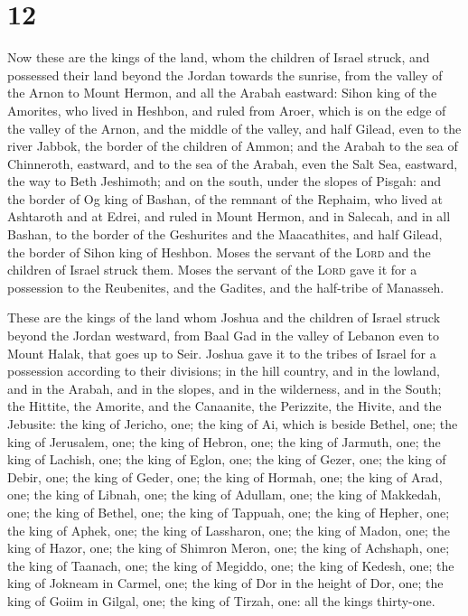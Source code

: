 \hypertarget{section-11}{%
\section{12}\label{section-11}}

 Now these are the kings of the land, whom the children of
Israel struck, and possessed their land beyond the Jordan towards the
sunrise, from the valley of the Arnon to Mount Hermon, and all the
Arabah eastward:  Sihon king of the Amorites, who lived in
Heshbon, and ruled from Aroer, which is on the edge of the valley of the
Arnon, and the middle of the valley, and half Gilead, even to the river
Jabbok, the border of the children of Ammon;  and the
Arabah to the sea of Chinneroth, eastward, and to the sea of the Arabah,
even the Salt Sea, eastward, the way to Beth Jeshimoth; and on the
south, under the slopes of Pisgah:  and the border of Og
king of Bashan, of the remnant of the Rephaim, who lived at Ashtaroth
and at Edrei,  and ruled in Mount Hermon, and in Salecah,
and in all Bashan, to the border of the Geshurites and the Maacathites,
and half Gilead, the border of Sihon king of Heshbon. 
Moses the servant of the \textsc{Lord} and the children of Israel struck
them. Moses the servant of the \textsc{Lord} gave it for a possession to
the Reubenites, and the Gadites, and the half-tribe of Manasseh.

 These are the kings of the land whom Joshua and the
children of Israel struck beyond the Jordan westward, from Baal Gad in
the valley of Lebanon even to Mount Halak, that goes up to Seir. Joshua
gave it to the tribes of Israel for a possession according to their
divisions;  in the hill country, and in the lowland, and
in the Arabah, and in the slopes, and in the wilderness, and in the
South; the Hittite, the Amorite, and the Canaanite, the Perizzite, the
Hivite, and the Jebusite:  the king of Jericho, one; the
king of Ai, which is beside Bethel, one;  the king of
Jerusalem, one; the king of Hebron, one;  the king of
Jarmuth, one; the king of Lachish, one;  the king of
Eglon, one; the king of Gezer, one;  the king of Debir,
one; the king of Geder, one;  the king of Hormah, one;
the king of Arad, one;  the king of Libnah, one; the king
of Adullam, one;  the king of Makkedah, one; the king of
Bethel, one;  the king of Tappuah, one; the king of
Hepher, one;  the king of Aphek, one; the king of
Lassharon, one;  the king of Madon, one; the king of
Hazor, one;  the king of Shimron Meron, one; the king of
Achshaph, one;  the king of Taanach, one; the king of
Megiddo, one;  the king of Kedesh, one; the king of
Jokneam in Carmel, one;  the king of Dor in the height of
Dor, one; the king of Goiim in Gilgal, one;  the king of
Tirzah, one: all the kings thirty-one.

